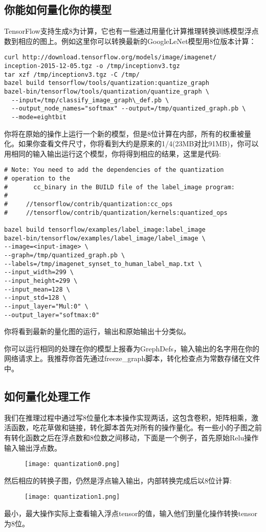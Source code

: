 \subsection{你能如何量化你的模型}
TensorFlow支持生成8为计算，它也有一些通过用量化计算推理转换训练模型浮点数到相应的图上。例如这里你可以转换最新的GoogleLeNet模型用8位版本计算：
\begin{lstlisting}[language={[ANSI]C}]
curl http://download.tensorflow.org/models/image/imagenet/
inception-2015-12-05.tgz -o /tmp/inceptionv3.tgz
tar xzf /tmp/inceptionv3.tgz -C /tmp/
bazel build tensorflow/tools/quantization:quantize_graph
bazel-bin/tensorflow/tools/quantization/quantize_graph \
  --input=/tmp/classify_image_graph\_def.pb \
  --output_node_names="softmax" --output=/tmp/quantized_graph.pb \
  --mode=eightbit
\end{lstlisting}
你将在原始的操作上运行一个新的模型，但是8位计算在内部，所有的权重被量化。如果你查看文件尺寸，你将看到大约是原来的1/4(23MB对比91MB)，你可以用相同的输入输出运行这个模型，你将得到相应的结果，这里是代码:
\begin{lstlisting}[language={[ANSI]C}]
# Note: You need to add the dependencies of the quantization
# operation to the
#       cc_binary in the BUILD file of the label_image program:
#
#     //tensorflow/contrib/quantization:cc_ops
#     //tensorflow/contrib/quantization/kernels:quantized_ops

bazel build tensorflow/examples/label_image:label_image
bazel-bin/tensorflow/examples/label_image/label_image \
--image=<input-image> \
--graph=/tmp/quantized_graph.pb \
--labels=/tmp/imagenet_synset_to_human_label_map.txt \
--input_width=299 \
--input_height=299 \
--input_mean=128 \
--input_std=128 \
--input_layer="Mul:0" \
--output_layer="softmax:0"
\end{lstlisting}
你将看到最新的量化图的运行，输出和原始输出十分类似。

你可以运行相同的处理在你的模型上报春为GrephDefs，输入输出的名字用在你的网络请求上。我推荐你首先通过freeze\_graph脚本，转化检查点为常数存储在文件中。
\subsection{如何量化处理工作}
我们在推理过程中通过写8位量化本本操作实现两话，这包含卷积，矩阵相乘，激活函数，吃花草做和链接，转化脚本首先对所有的操作量化。有一些小的子图之前有转化函数之后在浮点数和8位数之间移动，下面是一个例子，首先原始Relu操作输入输出浮点数。
\begin{center}
\begin{figure}[H]
\texttt{[image: quantization0.png]}
\end{figure}
\end{center}
然后相应的转换子图，仍然是浮点输入输出，内部转换完成后以8位计算:
\begin{center}
\begin{figure}[H]
\texttt{[image: quantization1.png]}
\end{figure}
\end{center}
最小，最大操作实际上查看输入浮点tensor的值，输入他们到量化操作转换tensor为8位。

